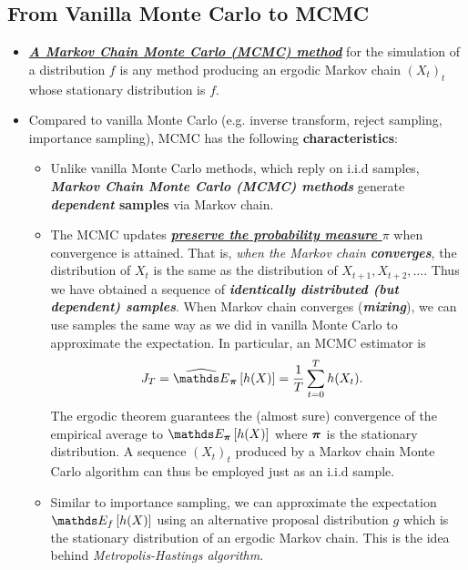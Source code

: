 \documentclass[11pt]{article}
\begin{document}
\subsection{From Vanilla Monte Carlo to MCMC}
\begin{itemize}
\item \begin{definition}
\underline{\emph{\textbf{A Markov Chain Monte Carlo (MCMC) method}}} for the simulation of a distribution $f$ is any method producing an ergodic Markov chain $(X_t)_t$ whose stationary distribution is $f$.
\end{definition}

\item Compared to vanilla Monte Carlo (e.g. inverse transform, reject sampling, importance sampling), MCMC has the following \textbf{characteristics}:
\begin{itemize}
\item Unlike vanilla Monte Carlo methods, which reply on i.i.d samples, \emph{\textbf{Markov Chain Monte Carlo (MCMC) methods}} generate \textbf{\emph{dependent} samples} via Markov chain. 

\item The MCMC updates \underline{\emph{\textbf{preserve the probability measure $\pi$}}} when convergence is attained. That is, \emph{when the Markov chain \textbf{converges}}, the distribution of $X_t$ is the same as the distribution of $X_{t+1}, X_{t+2}, \ldots$. Thus we have obtained a sequence of \emph{\textbf{identically distributed (but dependent) samples}}. When Markov chain converges (\emph{\textbf{mixing}}), we can use samples the same way as we did in vanilla Monte Carlo to approximate the expectation. In particular, an MCMC estimator is
\begin{align}
J_{T} &= \Em{\mb{\pi}}{h(X)} = \frac{1}{T}\sum_{t=0}^{T}h(X_t). \label{eqn: mcmc_estimator}
\end{align} The ergodic theorem guarantees the (almost sure) convergence of the empirical average  to $\E{\mb{\pi}}{h(X)}$ where $\boldsymbol{\pi}$ is the stationary distribution. A sequence $(X_t)_t$ produced by a Markov chain Monte Carlo algorithm can thus be employed just as an i.i.d sample.

\item Similar to importance sampling, we can approximate the expectation $\E{f}{h(X)}$ using an alternative proposal distribution $g$ which is the stationary distribution of an ergodic Markov chain. This is the idea behind \emph{Metropolis-Hastings algorithm}. 
\end{itemize}


\end{itemize}
\end{document}
